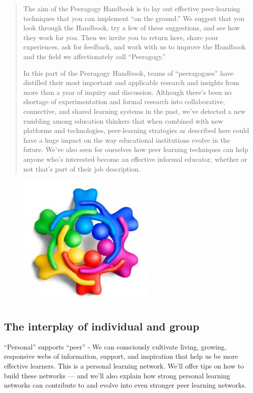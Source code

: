 \begin{quote}
The aim of the Peeragogy Handbook is to lay out effective peer-learning
techniques that you can implement ``on the ground.'' We suggest that you
look through the Handbook, try a few of these suggestions, and see how
they work for you. Then we invite you to return here, share your
experiences, ask for feedback, and work with us to improve the Handbook
and the field we affectionately call ``Peeragogy.''

In this part of the Peeragogy Handbook, teams of ``peeragogues'' have
distilled their most important and applicable research and insights from
more than a year of inquiry and discussion. Although there's been no
shortage of experimentation and formal research into collaborative,
connective, and shared learning systems in the past, we've detected a
new rumbling among education thinkers that when combined with new
platforms and technologies, peer-learning strategies as described here
could have a huge impact on the way educational institutions evolve in
the future. We've also seen for ourselves how peer learning techniques
can help anyone who's interested become an effective informal educator,
whether or not that's part of their job description.
\end{quote}

\begin{figure}[htbp]
\centering
\includegraphics[width=.4\textwidth]{../pictures/peeragogy-in-action.jpg}
\end{figure}

\subsection{The interplay of individual and group}

``Personal'' supports ``peer'' - We can consciously cultivate living,
growing, responsive webs of information, support, and inspiration that
help us be more effective learners. This is a personal learning network.
We'll offer tips on how to build these networks --- and we'll also
explain how strong personal learning networks can contribute to and
evolve into even stronger peer learning networks.

